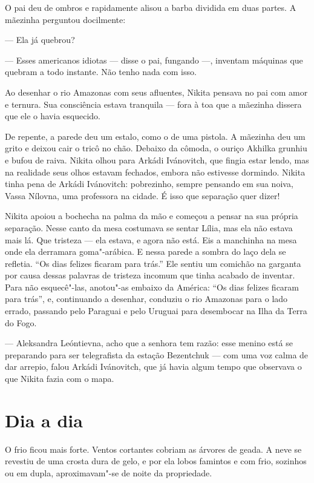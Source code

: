 O pai deu de ombros e rapidamente alisou a barba dividida em duas
partes. A mãezinha perguntou docilmente:

--- Ela já quebrou?

--- Esses americanos idiotas --- disse o pai, fungando ---, inventam
máquinas que quebram a todo instante. Não tenho nada com isso.

Ao desenhar o rio Amazonas com seus afluentes, Nikita pensava no pai com
amor e ternura. Sua consciência estava tranquila --- fora à toa que a
mãezinha dissera que ele o havia esquecido.

De repente, a parede deu um estalo, como o de uma pistola. A mãezinha
deu um grito e deixou cair o tricô no chão. Debaixo da cômoda, o ouriço
Akhilka grunhiu e bufou de raiva. Nikita olhou para Arkádi Ivánovitch,
que fingia estar lendo, mas na realidade seus olhos estavam fechados,
embora não estivesse dormindo. Nikita tinha pena de Arkádi Ivánovitch:
pobrezinho, sempre pensando em sua noiva, Vassa Nílovna, uma professora
na cidade. É isso que separação quer dizer!

Nikita apoiou a bochecha na palma da mão e começou a pensar na sua
própria separação. Nesse canto da mesa costumava se sentar Lília, mas
ela não estava mais lá. Que tristeza --- ela estava, e agora não está.
Eis a manchinha na mesa onde ela derramara goma"-arábica. E nessa parede
a sombra do laço dela se refletia. ``Os dias felizes ficaram para
trás.'' Ele sentiu um comichão na garganta por causa dessas palavras
de tristeza incomum que tinha acabado de inventar. Para não esquecê"-las,
anotou"-as embaixo da América: ``Os dias felizes ficaram para trás'', e,
continuando a desenhar, conduziu o rio Amazonas para o lado errado,
passando pelo Paraguai e pelo Uruguai para desembocar na Ilha da Terra
do Fogo.

--- Aleksandra Leóntievna, acho que a senhora tem razão: esse menino
está se preparando para ser telegrafista da estação Bezentchuk --- com
uma voz calma de dar arrepio, falou Arkádi Ivánovitch, que já havia
algum tempo que observava o que Nikita fazia com o mapa.

\chapter{Dia a dia}

O frio ficou mais forte. Ventos cortantes cobriam as árvores de geada. A
neve se revestiu de uma crosta dura de gelo, e por ela lobos famintos e
com frio, sozinhos ou em dupla, aproximavam"-se de noite da propriedade.

